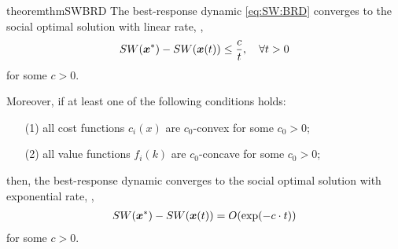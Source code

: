 \begin{restatable}{theorem}{thmSWBRD}
\label{thm:SW:BRD}
    The best-response dynamic \cref{eq:SW:BRD} converges to the social optimal solution with linear rate, \ie,
    \begin{align*}
        SW({\bm{x}}^*) - SW({\bm{x}}(t)) \le \frac{c}{t},\quad \forall t>0
    \end{align*}
    for some $c > 0$.

    Moreover, if at least one of the following conditions holds:
    \begin{itemize}
        \item[(1)] all cost functions $c_i(x)$ are $c_0$-convex for some $c_0>0$;
        \item[(2)] all value functions $f_i(k)$ are $c_0$-concave for some $c_0>0$;
    \end{itemize}
    then, the best-response dynamic converges to the social optimal solution with exponential rate, \ie,
    \begin{align*}
        SW({\bm{x}}^*) - SW({\bm{x}}(t)) = O(\exp(-c\cdot t))
    \end{align*}
    for some $c>0$.
\end{restatable}